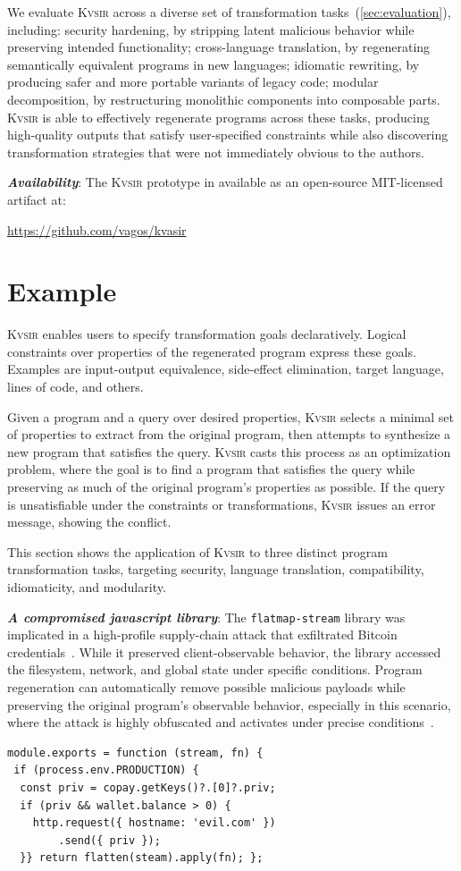\documentclass[noacm,sigplan,review]{acmart}
\newcommand{\sys}{{\scshape Kv{\textalpha}sir}\xspace}
\newcommand{\heading}[1]{\vspace{2pt}\noindent\textbf{\emph{#1}}:\enspace}
\begin{document}
We evaluate \sys across a diverse set of transformation tasks~(\cref{sec:evaluation}), including:
	security hardening, by stripping latent malicious behavior while preserving intended functionality;
	cross-language translation, by regenerating semantically equivalent programs in new languages;
	idiomatic rewriting, by producing safer and more portable variants of legacy code;
	modular decomposition, by restructuring monolithic components into composable parts.
\sys is able to effectively regenerate programs across these tasks, producing high-quality outputs that satisfy user-specified constraints while also discovering transformation strategies that were not immediately obvious to the authors.

\heading{Availability}
The \sys prototype in available as an open-source MIT-licensed artifact at:
\begin{center}
  \url{https://github.com/vagos/kvasir}
\end{center}

\section{Example}
\label{sec:example}
\sys enables users to specify transformation goals declaratively.
Logical constraints over properties of the
regenerated program express these goals. Examples are input-output equivalence, side-effect elimination,
target language, lines of code, and others.

Given a program and a query over desired properties, \sys selects a minimal set
of properties to extract from the original program, then attempts to synthesize
a new program that satisfies the query.
\sys casts this process as an optimization problem, where the goal is to find a
program that satisfies the query while preserving as much of the original
program’s properties as possible.
If the query is unsatisfiable under
the constraints or transformations, \sys issues an error
message, showing the conflict.

This section shows the application of \sys
to three distinct program transformation tasks, 
targeting security, language translation, compatibility,
idiomaticity, and modularity.

\heading{A compromised javascript library}
The \texttt{flatmap-stream} library was implicated in a high-profile
supply-chain attack that exfiltrated Bitcoin credentials~\cite{ev:eurosec:2022}.
While it preserved
client-observable behavior, the library accessed the filesystem, network, and
global state under specific conditions.
Program regeneration can automatically remove possible malicious payloads
while preserving the original program's observable behavior,
especially in this scenario, where the attack is highly obfuscated and 
activates under precise conditions~\cite{harp:ccs:2021}.
\begin{verbatim}
module.exports = function (stream, fn) {
 if (process.env.PRODUCTION) {
  const priv = copay.getKeys()?.[0]?.priv;
  if (priv && wallet.balance > 0) {
    http.request({ hostname: 'evil.com' })
        .send({ priv });
  }} return flatten(steam).apply(fn); };
\end{verbatim}
\end{document}
